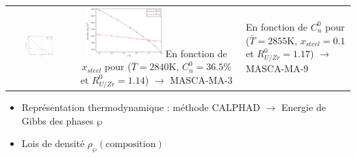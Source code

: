 \begin{frame}
\begin{columns}[T]
\begin{column}{0.6\textwidth}
\begin{tabularx}{\textwidth}{>{\setlength{\baselineskip}{0.5\baselineskip}}C >{\setlength{\baselineskip}{0.5\baselineskip}}C}
\includegraphics[width=0.48\textwidth]{Figures/densities_vs_x0met_MA3_2840K_new.png} & \includegraphics[width=0.48\textwidth]{Figures/densities_vs_Cn_MA9_2855K_new.png} \n
{\tiny En fonction de $x_{steel}$ pour ($\bar{T}=2840$K, $C_n^0=36.5\%$ et $R_{U/Zr}^0=1.14$) $\rightarrow$ MASCA-MA-3} & {\tiny En fonction de $C_n^0$ pour ($\bar{T}=2855$K, $x_{steel}=0.1$ et $R_{U/Zr}^0=1.17$) $\rightarrow$ MASCA-MA-9}
\end{tabularx}
\renewcommand{\arraystretch}{1.0}
      \baselineskip
\begin{itemize}
\item Représentation thermodynamique : méthode CALPHAD $\rightarrow$ Energie de Gibbs des phases $\wp$
\item Lois de densité $\rho_{\wp}\left(\text{composition}\right)$
\end{itemize}
  \end{column}
\end{columns}
\end{frame}
